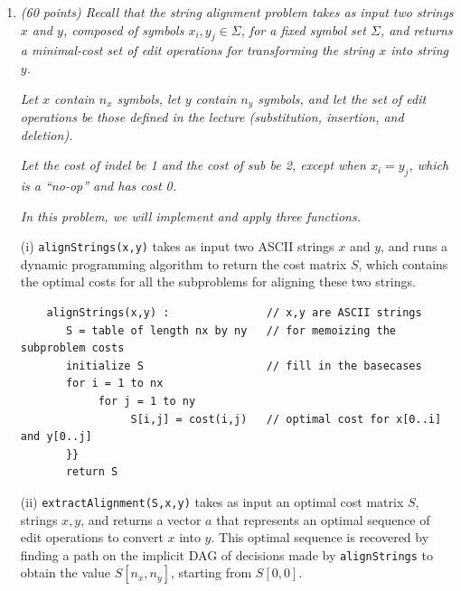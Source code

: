\documentclass[12pt]{article}
\begin{document}
\renewcommand{\headrulewidth}{0.4pt}


\vspace{-3mm}
\begin{enumerate}
    
	\item \textit{ (60 points) Recall that the \textit{string alignment problem} takes as input two strings $x$ and $y$, composed of symbols $x_{i},y_{j}\in \Sigma$, for a fixed symbol set $\Sigma$, and returns a minimal-cost set of \textit{edit} operations for transforming the string $x$ into string $y$.}
	
	\textit{Let $x$ contain $n_{x}$ symbols, let $y$ contain $n_{y}$ symbols, and let the set of edit operations be those defined in the lecture (substitution, insertion, and deletion).}
	
	\textit{Let the cost of \textit{indel} be 1 and the cost of \textit{sub} be 2, except when $x_{i}=y_{j}$, which is a ``no-op'' and has cost 0.}
	
	\textit{In this problem, we will implement and apply three functions.}
	
	(i) {\tt alignStrings(x,y)} takes as input two ASCII strings $x$ and $y$, and runs a dynamic programming algorithm to return the cost matrix $S$, which contains the optimal costs for all the subproblems for aligning these two strings. 
	
	\begin{small}
	\begin{verbatim}
	alignStrings(x,y) :               // x,y are ASCII strings
	   S = table of length nx by ny   // for memoizing the subproblem costs
	   initialize S                   // fill in the basecases
	   for i = 1 to nx
	        for j = 1 to ny
	             S[i,j] = cost(i,j)   // optimal cost for x[0..i] and y[0..j]
	   }}
	   return S
	\end{verbatim}
	\end{small}
	
	(ii) {\tt extractAlignment(S,x,y)} takes as input an optimal cost matrix $S$, strings $x,y$, and returns a vector $a$ that represents an optimal sequence of edit operations to convert $x$ into $y$. This optimal sequence is recovered by finding a path on the implicit DAG of decisions made by {\tt alignStrings} to obtain the value $S[n_{x},n_{y}]$, starting from $S[0,0]$. 
	

\end{enumerate}
\end{document}
